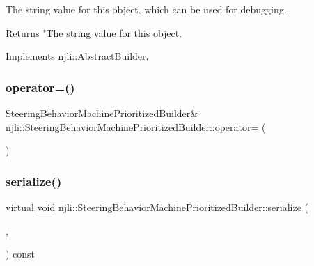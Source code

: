 The string value for this object, which can be used for debugging.

\begin{DoxyReturn}{Returns}
"The string value for this object. 
\end{DoxyReturn}


Implements \mbox{\hyperlink{classnjli_1_1_abstract_builder_a3e6e553e06d1ca30517ad5fb0bd4d000}{njli\+::\+Abstract\+Builder}}.

\mbox{\label{classnjli_1_1_steering_behavior_machine_prioritized_builder_aea975281872eada31c4494df16f3471c}} 
\subsubsection{\texorpdfstring{operator=()}{operator=()}}
{\footnotesize\ttfamily \mbox{\hyperlink{classnjli_1_1_steering_behavior_machine_prioritized_builder}{Steering\+Behavior\+Machine\+Prioritized\+Builder}}\& njli\+::\+Steering\+Behavior\+Machine\+Prioritized\+Builder\+::operator= (\begin{DoxyParamCaption}\item[{const \mbox{\hyperlink{classnjli_1_1_steering_behavior_machine_prioritized_builder}{Steering\+Behavior\+Machine\+Prioritized\+Builder}} \&}]{ }\end{DoxyParamCaption})\hspace{0.3cm}{\ttfamily [protected]}}

\mbox{\label{classnjli_1_1_steering_behavior_machine_prioritized_builder_abf6aca6a9c6afde88d4d3c7947563e8a}} 
\subsubsection{\texorpdfstring{serialize()}{serialize()}}
{\footnotesize\ttfamily virtual \mbox{\hyperlink{_thread_8h_af1e856da2e658414cb2456cb6f7ebc66}{void}} njli\+::\+Steering\+Behavior\+Machine\+Prioritized\+Builder\+::serialize (\begin{DoxyParamCaption}\item[{\mbox{\hyperlink{_thread_8h_af1e856da2e658414cb2456cb6f7ebc66}{void}} $\ast$}]{,  }\item[{bt\+Serializer $\ast$}]{ }\end{DoxyParamCaption}) const\hspace{0.3cm}{\ttfamily [virtual]}}

